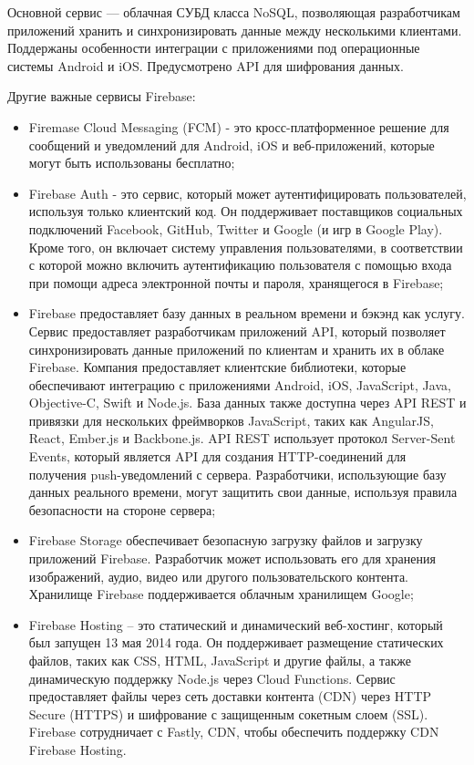 Основной сервис — облачная СУБД класса NoSQL, позволяющая разработчикам приложений хранить и синхронизировать данные между несколькими клиентами. Поддержаны особенности интеграции с приложениями под операционные системы Android и iOS. \newline Предусмотрено API для шифрования данных.

Другие важные сервисы Firebase:

\begin{itemize}
	\item Firemase Cloud Messaging (FCM) - это кросс-платформенное решение для сообщений и уведомлений для Android, iOS и веб-приложений, которые могут быть использованы бесплатно;
	\item Firebase Auth - это сервис, который может аутентифицировать пользователей, используя только клиентский код. Он поддерживает поставщиков социальных подключений Facebook, GitHub, Twitter и Google (и игр в Google Play). Кроме того, он включает систему управления пользователями, в соответствии с которой можно включить аутентификацию пользователя с помощью входа при помощи адреса электронной почты и пароля, хранящегося в Firebase;
	\item Firebase предоставляет базу данных в реальном времени и бэкэнд как услугу. Сервис предоставляет разработчикам приложений API, который позволяет синхронизировать данные приложений по клиентам и хранить их в облаке Firebase. Компания предоставляет клиентские библиотеки, которые обеспечивают интеграцию с приложениями Android, iOS, JavaScript, Java, Objective-C, Swift и Node.js. База данных также доступна через API REST и привязки для нескольких фреймворков JavaScript, таких как AngularJS, React, Ember.js и Backbone.js. API REST использует протокол Server-Sent Events, который является API для создания HTTP-соединений для получения push-уведомлений с сервера. Разработчики, использующие базу данных реального времени, могут защитить свои данные, используя правила безопасности на стороне сервера;
	\item Firebase Storage обеспечивает безопасную загрузку файлов и загрузку приложений Firebase. Разработчик может использовать его для хранения изображений, аудио, видео или другого пользовательского контента. Хранилище Firebase поддерживается облачным хранилищем Google;
	\item Firebase Hosting – это статический и динамический веб-хостинг, который был запущен 13 мая 2014 года. Он поддерживает размещение статических файлов, таких как CSS, HTML, JavaScript и другие файлы, а также динамическую поддержку Node.js через Cloud Functions. Сервис предоставляет файлы через сеть доставки контента (CDN) через HTTP Secure (HTTPS) и шифрование с защищенным сокетным слоем (SSL). Firebase сотрудничает с Fastly, CDN, чтобы обеспечить поддержку CDN Firebase Hosting.
\end{itemize}

